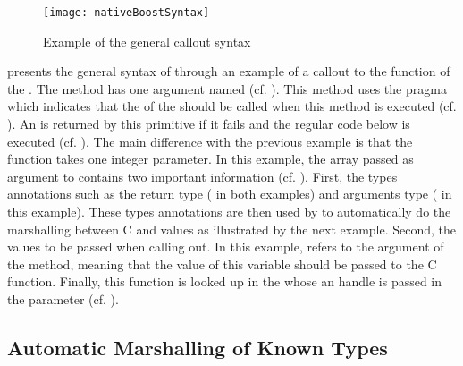 \begin{figure}[H]
	\centering
	\texttt{[image: nativeBoostSyntax]}
	\caption[\NB Basic Method]{Example of the general \NBFFI callout syntax}
\end{figure}

 presents the general syntax of \NBFFI through an example of a callout to the  function of the .
The  method has one argument named  (cf. ).
This method uses the pragma  which indicates that the  of the  should be called when this method is executed (cf. ).
An  is returned by this primitive if it fails and the regular \PH code below is executed (cf. ).
The main difference with the previous example is that the  function takes one integer parameter.
In this example, the array  passed as argument to  contains two important information (cf. ).
First, the types annotations such as the return type ( in both examples) and arguments type ( in this example).
These types annotations are then used by \NBFFI to automatically do the marshalling between C and \PH values as illustrated by the next example.
Second, the values to be passed when calling out.
In this example,  refers to the argument of the  method, meaning that the value of this variable should be passed to the  C function.
Finally, this  function is looked up in the  whose an handle is passed in the  parameter (cf. ).

\subsection{Automatic Marshalling of Known Types}

